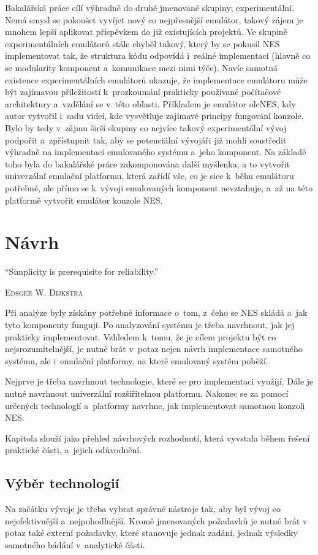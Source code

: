 Bakalářská práce cílí výhradně do druhé jmenované skupiny; experimentální. Nemá smysl se pokoušet vyvíjet nový co nejpřesnější emulátor, takový zájem je mnohem lepší aplikovat příspěvkem do již existujících projektů. Ve skupině experimentálních emulátorů stále chyběl takový, který by se pokusil NES implementovat tak, že struktura kódu odpovídá i~reálné implementaci (hlavně co se modularity komponent a~komunikace mezi nimi týče). Navíc samotná existence experimentálních emulátorů ukazuje, že implementace emulátoru může být zajímavou příležitostí k~prozkoumání prakticky používané počítačové architektury a~vzdělání se v~této oblasti. Příkladem je emulátor olcNES, kdy autor vytvořil i~sadu videí, kde vysvětluje zajímavé principy fungování konzole. Bylo by tedy v~zájmu širší skupiny co nejvíce takový experimentální vývoj podpořit a~zpřístupnit tak, aby se potenciální vývojáři již mohli soustředit výhradně na implementaci emulovaného systému a~jeho komponent. Na základě toho byla do bakalářské práce zakomponována další myšlenka, a to vytvořit univerzální emulační platformu, která zařídí vše, co je sice k~běhu emulátoru potřebné, ale přímo se k~vývoji emulovaných komponent nevztahuje, a~až na této platformě vytvořit emulátor konzole NES.

\chapter{Návrh}
\epigraph{
	\enquote{Simplicity is prerequisite for reliability.}
}{\textsc{Edsger W. Dijkstra}}

Při analýze byly získány potřebné informace o~tom, z~čeho se NES skládá a~jak tyto komponenty fungují. Po analyzování systému je třeba navrhnout, jak jej prakticky implementovat. Vzhledem k~tomu, že je cílem projektu být co nejsrozumitelnější, je nutné brát v~potaz nejen návrh implementace samotného systému, ale i~emulační platformy, na které emulovaný systém poběží.

Nejprve je třeba navrhnout technologie, které se pro implementaci využijí. Dále je nutné navrhnout univerzální rozšiřitelnou platformu. Nakonec se za pomocí určených technologií a~platformy navrhne, jak implementovat samotnou konzoli NES.

Kapitola slouží jako přehled návrhových rozhodnutí, která vyvstala během řešení praktické části, a~jejich odůvodnění.

\section{Výběr technologií}
Na začátku vývoje je třeba vybrat správné nástroje tak, aby byl vývoj co nejefektivnější a~nejpohodlnější. Kromě jmenovaných požadavků je nutné brát v potaz také externí požadavky, které stanovuje jednak zadání, jednak výsledky samotného bádání v~analytické části.

